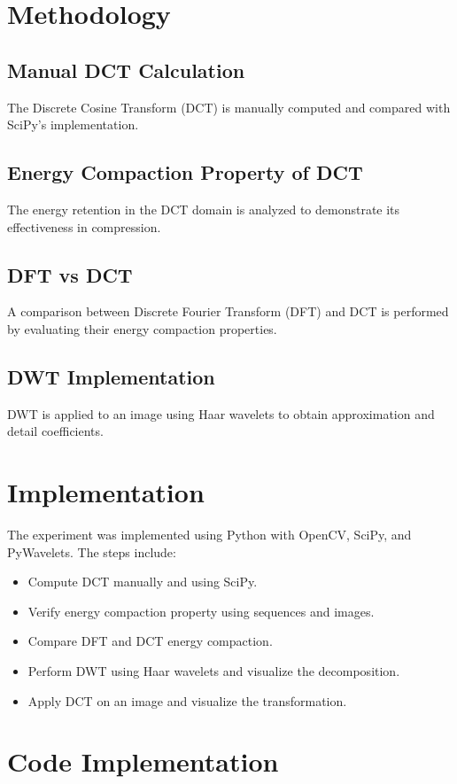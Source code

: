\documentclass{report}
\begin{document}
\section{Methodology}

\subsection{Manual DCT Calculation}
The Discrete Cosine Transform (DCT) is manually computed and compared with SciPy's implementation.

\subsection{Energy Compaction Property of DCT}
The energy retention in the DCT domain is analyzed to demonstrate its effectiveness in compression.

\subsection{DFT vs DCT}
A comparison between Discrete Fourier Transform (DFT) and DCT is performed by evaluating their energy compaction properties.

\subsection{DWT Implementation}
DWT is applied to an image using Haar wavelets to obtain approximation and detail coefficients.

\section{Implementation}
The experiment was implemented using Python with OpenCV, SciPy, and PyWavelets. The steps include:

\begin{itemize}
    \item Compute DCT manually and using SciPy.
    \item Verify energy compaction property using sequences and images.
    \item Compare DFT and DCT energy compaction.
    \item Perform DWT using Haar wavelets and visualize the decomposition.
    \item Apply DCT on an image and visualize the transformation.
\end{itemize}

\section{Code Implementation}
\end{document}
